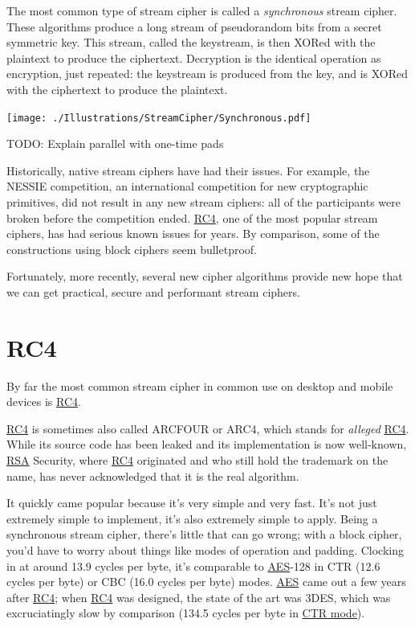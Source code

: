 \documentclass[11pt,ebook,table,dvipsnames]{memoir}
\begin{document}
The most common type of stream cipher is called a \emph{synchronous} stream
cipher. These algorithms produce a long stream of pseudorandom bits
from a secret symmetric key. This stream, called the keystream, is
then XORed with the plaintext to produce the ciphertext. Decryption is
the identical operation as encryption, just repeated: the keystream is
produced from the key, and is XORed with the ciphertext to produce the
plaintext.

\texttt{[image: ./Illustrations/StreamCipher/Synchronous.pdf]}

TODO: Explain parallel with one-time pads

Historically, native stream ciphers have had their issues. For
example, the NESSIE competition, an international competition for new
cryptographic primitives, did not result in any new stream ciphers:
all of the participants were broken before the competition ended. \hyperref[RC4]{RC4},
one of the most popular stream ciphers, has had serious known issues
for years. By comparison, some of the constructions using block
ciphers seem bulletproof.

Fortunately, more recently, several new cipher algorithms provide new
hope that we can get practical, secure and performant stream ciphers.
\section{\label{RC4}RC4}
\label{sec-2-3-9}

By far the most common \gls{stream cipher} in common use on desktop
and mobile devices is \hyperref[RC4]{RC4}.

\hyperref[RC4]{RC4} is sometimes also called ARCFOUR or ARC4, which stands for
\emph{alleged} \hyperref[RC4]{RC4}. While its source code has been leaked and its
implementation is now well-known, \hyperref[RSA]{RSA} Security, where \hyperref[RC4]{RC4} originated
and who still hold the trademark on the name, has never acknowledged
that it is the real algorithm.

It quickly came popular because it's very simple and very fast. It's
not just extremely simple to implement, it's also extremely simple to
apply. Being a synchronous stream cipher, there's little that can go
wrong; with a block cipher, you'd have to worry about things like
modes of operation and padding. Clocking in at around 13.9 cycles per
byte, it's comparable to \hyperref[AES]{AES}-128 in CTR (12.6 cycles per byte) or CBC
(16.0 cycles per byte) modes. \hyperref[AES]{AES} came out a few years after \hyperref[RC4]{RC4}; when
\hyperref[RC4]{RC4} was designed, the state of the art was 3DES, which was
excruciatingly slow by comparison (134.5 cycles per byte in \hyperref[CTR-mode]{CTR mode}).
\cite{cryptopp:bench}
\end{document}
